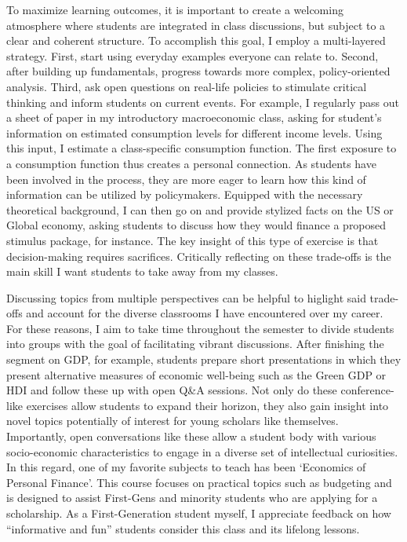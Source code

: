 \documentclass[a4paper,12pt]{article}
\begin{document}
To maximize learning outcomes, it is important to create a welcoming atmosphere where students are integrated in class discussions, but subject to a clear and coherent structure. To accomplish this goal, I employ a multi-layered strategy. First, start using everyday examples everyone can relate to. Second, after building up fundamentals, progress towards more complex, policy-oriented analysis. Third, ask open questions on real-life policies to stimulate critical thinking and inform students on current events. For example, I regularly pass out a sheet of paper in my introductory macroeconomic class, asking for student’s information on estimated consumption levels for different income levels. Using this input, I estimate a class-specific consumption function. The first exposure to a consumption function thus creates a personal connection. As students have been involved in the process, they are more eager to learn how this kind of information can be utilized by policymakers. Equipped with the necessary theoretical background, I can then go on and provide stylized facts on the US or Global economy, asking students to discuss how they would finance a proposed stimulus package, for instance. The key insight of this type of exercise is that decision-making requires sacrifices. Critically reflecting on these trade-offs is the main skill I want students to take away from my classes. 


Discussing topics from multiple perspectives can be helpful to higlight said trade-offs and account for the diverse classrooms I have encountered over my career. For these reasons, I aim to take time throughout the semester to divide students into groups with the goal of facilitating vibrant discussions. After finishing the segment on GDP, for example,  students prepare short presentations in which they present alternative measures of economic well-being such as the Green GDP or HDI and follow these up with open Q\&A sessions. Not only do these conference-like exercises allow students to expand their horizon, they also gain insight into novel topics potentially of interest for young scholars like themselves. Importantly, open conversations like these allow a student body with various socio-economic characteristics to engage in a diverse set of intellectual curiosities. In this regard, one of my favorite subjects to teach has been `Economics of Personal Finance'. This course focuses on practical topics such as budgeting and is designed to assist First-Gens and minority students who are applying for a scholarship. As a First-Generation student myself, I appreciate feedback on how “informative and fun” students consider this class and its lifelong lessons. 
\end{document}
